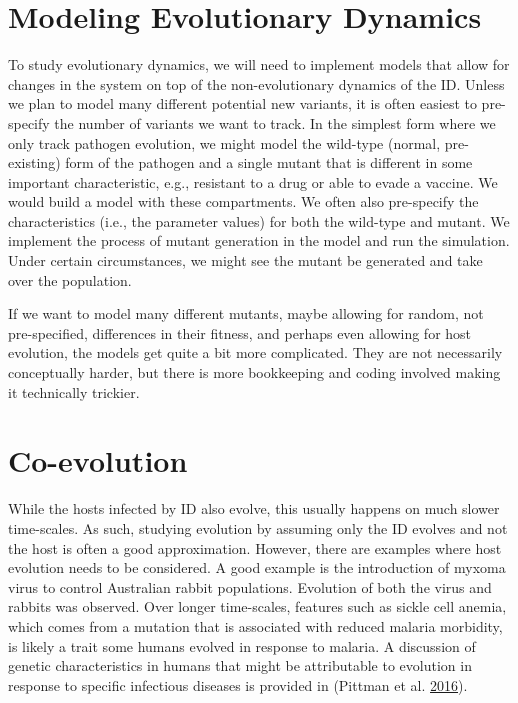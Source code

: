 \documentclass[
]{book}
\begin{document}
\hypertarget{modeling-evolutionary-dynamics}{%
\section{Modeling Evolutionary Dynamics}\label{modeling-evolutionary-dynamics}}

To study evolutionary dynamics, we will need to implement models that allow for changes in the system on top of the non-evolutionary dynamics of the ID. Unless we plan to model many different potential new variants, it is often easiest to pre-specify the number of variants we want to track. In the simplest form where we only track pathogen evolution, we might model the wild-type (normal, pre-existing) form of the pathogen and a single mutant that is different in some important characteristic, e.g., resistant to a drug or able to evade a vaccine. We would build a model with these compartments. We often also pre-specify the characteristics (i.e., the parameter values) for both the wild-type and mutant. We implement the process of mutant generation in the model and run the simulation. Under certain circumstances, we might see the mutant be generated and take over the population.

If we want to model many different mutants, maybe allowing for random, not pre-specified, differences in their fitness, and perhaps even allowing for host evolution, the models get quite a bit more complicated. They are not necessarily conceptually harder, but there is more bookkeeping and coding involved making it technically trickier.

\hypertarget{co-evolution}{%
\section{Co-evolution}\label{co-evolution}}

While the hosts infected by ID also evolve, this usually happens on much slower time-scales. As such, studying evolution by assuming only the ID evolves and not the host is often a good approximation. However, there are examples where host evolution needs to be considered. A good example is the introduction of myxoma virus to control Australian rabbit populations. Evolution of both the virus and rabbits was observed. Over longer time-scales, features such as sickle cell anemia, which comes from a mutation that is associated with reduced malaria morbidity, is likely a trait some humans evolved in response to malaria. A discussion of genetic characteristics in humans that might be attributable to evolution in response to specific infectious diseases is provided in (Pittman et al. \protect\hyperlink{ref-pittman16}{2016}).
\end{document}
